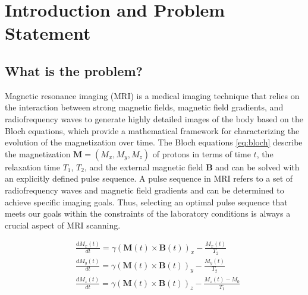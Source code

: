 \section{Introduction and Problem Statement}
\subsection{What is the problem?}
Magnetic resonance imaging (MRI) is a medical imaging technique that relies on the interaction between strong magnetic fields, magnetic field gradients, and radiofrequency waves to generate highly detailed images of the body based on the Bloch equations, which provide a mathematical framework for characterizing the evolution of the magnetization over time. The Bloch equations \eqref{eq:bloch} describe the magnetization $\mathbf{M}=(M_x, M_y, M_z)$ of protons in terms of time $t$, the relaxation time $T_1$, $T_2$, and the external magnetic field $\mathbf{B}$ and can be solved with an explicitly defined pulse sequence. A pulse sequence in MRI refers to a set of radiofrequency waves and magnetic field gradients and can be determined to achieve specific imaging goals. Thus, selecting an optimal pulse sequence that meets our goals within the constraints of the laboratory conditions is always a crucial aspect of MRI scanning.

\begin{equation}
    \begin{aligned}\label{eq:bloch}
    & \frac{d M_x(t)}{d t}=\gamma(\mathbf{M}(t) \times \mathbf{B}(t))_x-\frac{M_x(t)}{T_2} \\
    & \frac{d M_y(t)}{d t}=\gamma(\mathbf{M}(t) \times \mathbf{B}(t))_y-\frac{M_y(t)}{T_2} \\
    & \frac{d M_z(t)}{d t}=\gamma(\mathbf{M}(t) \times \mathbf{B}(t))_z-\frac{M_z(t)-M_0}{T_1}
    \end{aligned}
\end{equation}


